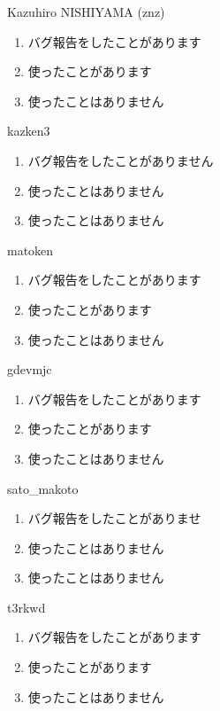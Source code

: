 \begin{prework}{ Kazuhiro NISHIYAMA (znz) }
  \begin{enumerate}
  \item バグ報告をしたことがあります
  \item 使ったことがあります
  \item 使ったことはありません
  \end{enumerate}
\end{prework}

\begin{prework}{ kazken3 }
  \begin{enumerate}
  \item バグ報告をしたことがありません
  \item 使ったことはありません
  \item 使ったことはありません
  \end{enumerate}
\end{prework}

\begin{prework}{ matoken }
  \begin{enumerate}
  \item バグ報告をしたことがあります
  \item 使ったことがあります
  \item 使ったことはありません
  \end{enumerate}
\end{prework}

\begin{prework}{ gdevmjc }
  \begin{enumerate}
  \item バグ報告をしたことがあります
  \item 使ったことがあります
  \item 使ったことはありません
  \end{enumerate}
\end{prework}

\begin{prework}{ sato\_makoto }
  \begin{enumerate}
  \item バグ報告をしたことがありませ
  \item 使ったことはありません
  \item 使ったことはありません
  \end{enumerate}
\end{prework}

\begin{prework}{ t3rkwd }
  \begin{enumerate}
  \item バグ報告をしたことがあります
  \item 使ったことがあります
  \item 使ったことはありません
  \end{enumerate}
\end{prework}
